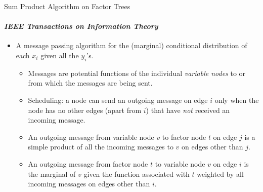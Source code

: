 \documentclass[letter,graphicx]{beamer}
\begin{document}
 \begin{frame}{Sum Product Algorithm on Factor Trees}
 \framesubtitle{\citet{kschischang2001factor} {\em IEEE Transactions on Information Theory}}
 \begin{itemize}
 	\item A message passing algorithm for the (marginal) conditional distribution of each $x_i$ given all the $y_i$'s.
 	\begin{itemize}
 		\item Messages are potential functions of the individual {\em variable nodes} to or from which the messages are being sent.
 		\item Scheduling: a node can send an outgoing message on edge $i$ only when the node has no other edges (apart from $i$) that have {\em not} received an incoming message.
		 \item An outgoing message from variable node $v$ to factor node $t$ on edge $j$ is a simple product of all the incoming messages to $v$ on edges other than $j$.
 		\item An outgoing message from factor node $t$ to variable node $v$ on edge $i$ is the marginal of $v$ given the function associated with $t$ weighted by all incoming messages on edges other than $i$.
 	\end{itemize}
 \end{itemize}
 \end{frame}
\end{document}
